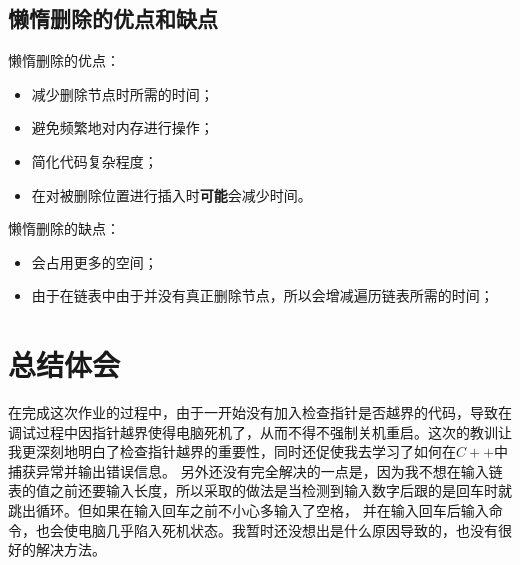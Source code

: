 \documentclass[UTF8]{ctexart}
\begin{document}
	\subsection{懒惰删除的优点和缺点}\label{adv_and_disadv_of_lazy_deletion}
	\indent 懒惰删除的优点：
	\begin{itemize}[leftmargin=50pt]
	\item 减少删除节点时所需的时间；
	\item 避免频繁地对内存进行操作；
	\item 简化代码复杂程度；
	\item 在对被删除位置进行插入时\textbf{可能}会减少时间。
	\end{itemize}
	
	\indent 懒惰删除的缺点：
	\begin{itemize}[leftmargin=50pt]
	\item 会占用更多的空间；
	\item 由于在链表中由于并没有真正删除节点，所以会增减遍历链表所需的时间；
	\end{itemize}
	\section{总结体会}
	\indent 在完成这次作业的过程中，由于一开始没有加入检查指针是否越界的代码，导致在调试过程中因指针越界使得电脑死机了，从而不得不强制关机重启。这次的教训让我更深刻地明白了检查指针越界的重要性，同时还促使我去学习了如何在$C++$中捕获异常并输出错误信息。
	\indent 另外还没有完全解决的一点是，因为我不想在输入链表的值之前还要输入长度，所以采取的做法是当检测到输入数字后跟的是回车时就跳出循环。但如果在输入回车之前不小心多输入了空格，
并在输入回车后输入命令，也会使电脑几乎陷入死机状态。我暂时还没想出是什么原因导致的，也没有很好的解决方法。


\end{document}
